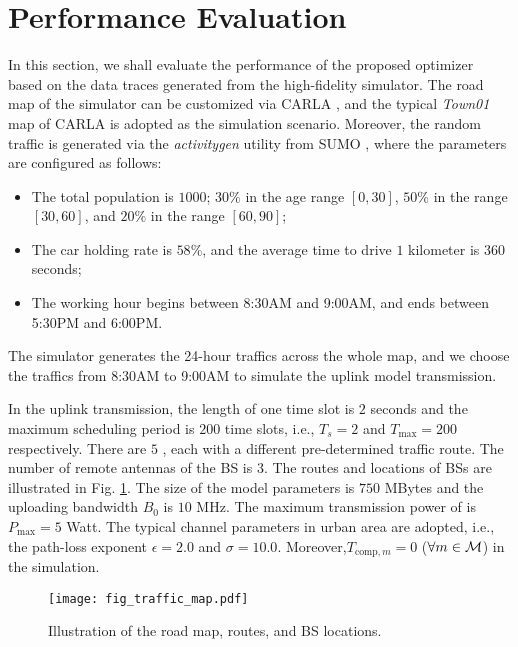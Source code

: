 \section{Performance Evaluation}
\label{sec:simulation}
In this section, we shall evaluate the performance of the proposed {\fwName} optimizer based on the data traces generated from the high-fidelity {\fwName} simulator. The road map of the {\fwName} simulator can be customized via CARLA \cite{CARLA}, and the typical \emph{Town01} map of CARLA is adopted as the simulation scenario. Moreover, the random traffic is generated via the \emph{activitygen} utility from SUMO \cite{SUMO}, where the parameters are configured as follows:
\begin{itemize}
    \item The total population is $1000$; $30\%$ in the age range $[0, 30]$, $50\%$ in the range $[30, 60]$, and $20\%$ in the range $[60, 90]$;
    \item The car holding rate is $58\%$, and the average time to drive $1$ kilometer is $360$ seconds;
    \item The working hour begins between 8:30AM and 9:00AM, and ends between 5:30PM and 6:00PM.
\end{itemize}
The simulator generates the 24-hour traffics across the whole map, and we choose the traffics from 8:30AM to 9:00AM to simulate the uplink model transmission.

In the uplink transmission, the length of one time slot is $2$ seconds and the maximum scheduling period is $200$ time slots, i.e., $T_s=2$ and $T_{\max}=200$ respectively.
There are $5$ {\IAVs}, each with a different pre-determined traffic route.
The number of remote antennas of the BS is $3$. The routes and locations of BSs are illustrated in Fig. \ref{fig:traffic_map}. The size of the model parameters is $750$ MBytes and the uploading bandwidth $B_0$ is $10$ MHz. The maximum transmission power of {\IAVs} is $P_{\max} = 5$ Watt. The typical channel parameters in urban area are adopted, i.e., the path-loss exponent $\epsilon=2.0$ and $\sigma=10.0$. Moreover,$T_{\text{comp},m}=0$ ($\forall m\in\mathcal{M}$) in the simulation.

\begin{figure}[htp!]
    \centering
    \texttt{[image: fig\_traffic\_map.pdf]}
    \caption{Illustration of the road map, {\IAV} routes, and BS locations.}
    \label{fig:traffic_map}
\end{figure}

